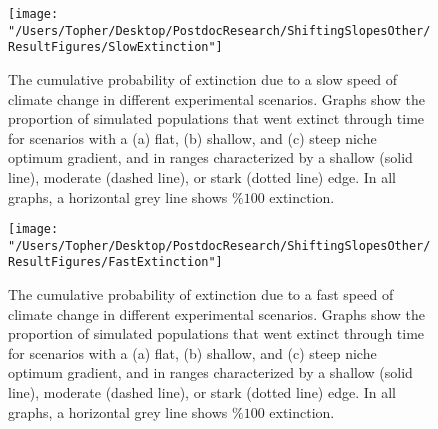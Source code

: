 \documentclass[11pt]{article}
\begin{document}
\clearpage

\renewcommand{\thefigure}{B\arabic{figure}}
\setcounter{figure}{0}

\begin{figure}[h!]
\texttt{[image: "/Users/Topher/Desktop/PostdocResearch/ShiftingSlopesOther/ResultFigures/SlowExtinction"]}
\caption{The cumulative probability of extinction due to a slow speed of climate change in different experimental scenarios. Graphs show the proportion of simulated populations that went extinct through time for scenarios with a (a) flat, (b) shallow, and (c) steep niche optimum gradient, and in ranges characterized by a shallow (solid line), moderate (dashed line), or stark (dotted line) edge. In all graphs, a horizontal grey line shows $\%100$ extinction.}
\label{Fig:ExtProbSlow}
\end{figure}

\clearpage

\begin{figure}[h!]
\texttt{[image: "/Users/Topher/Desktop/PostdocResearch/ShiftingSlopesOther/ResultFigures/FastExtinction"]}
\caption{The cumulative probability of extinction due to a fast speed of climate change in different experimental scenarios. Graphs show the proportion of simulated populations that went extinct through time for scenarios with a (a) flat, (b) shallow, and (c) steep niche optimum gradient, and in ranges characterized by a shallow (solid line), moderate (dashed line), or stark (dotted line) edge. In all graphs, a horizontal grey line shows $\%100$ extinction.}
\label{Fig:ExtProbFast}
\end{figure}

\clearpage



\end{document}
